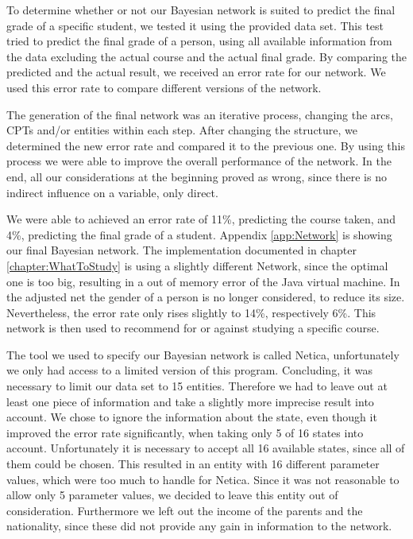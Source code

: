 \documentclass[%
	pdftex,
	oneside,        %
	11pt,           %
	parskip=half,   %
	headsepline,    %
	footsepline,    %
	abstracton,     %
	USenglish,      %
	a4paper,        %
]{report}
\begin{document}
To determine whether or not our Bayesian network is suited to predict the final grade of a specific student, we tested it using the provided data set. This test tried to predict the final grade of a person, using all available information from the data excluding the actual course and the actual final grade. By comparing the predicted and the actual result, we received an error rate for our network. We used this error rate to compare different versions of the network.

The generation of the final network was an iterative process, changing the arcs, CPTs and/or entities within each step. After changing the structure, we determined the new error rate and compared it to the previous one. By using this process we were able to improve the overall performance of the network. In the end, all our considerations at the beginning proved as wrong, since there is no indirect influence on a variable, only direct.

We were able to achieved an error rate of 11\%, predicting the course taken, and 4\%, predicting the final grade of a student. Appendix \vref{app:Network} is showing our final Bayesian network. The implementation documented in chapter \vref{chapter:WhatToStudy} is using a slightly different Network, since the optimal one is too big, resulting in a out of memory error of the Java virtual machine. In the adjusted net the gender of a person is no longer considered, to reduce its size. Nevertheless, the error rate only rises slightly to 14\%, respectively 6\%. This network is then used to recommend for or against studying a specific course. 

The tool we used to specify our Bayesian network is called Netica, unfortunately we only had access to a limited version of this program. Concluding, it was necessary to limit our data set to 15 entities. Therefore we had to leave out at least one piece of information and take a slightly more imprecise result into account. We chose to ignore the information about the state, even though it improved the error rate significantly, when taking only 5 of 16 states into account. Unfortunately it is necessary to accept all 16 available states, since all of them could be chosen. This resulted in an entity with 16 different parameter values, which were too much to handle for Netica. Since it was not reasonable to allow only 5 parameter values, we decided to leave this entity out of consideration. Furthermore we left out the income of the parents and the nationality, since these did not provide any gain in information to the network.
\end{document}
